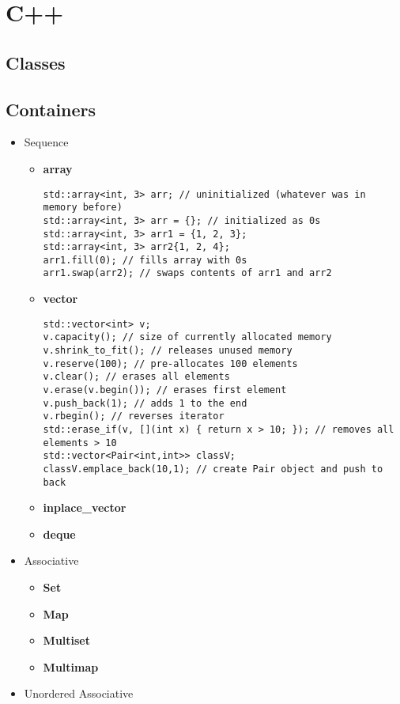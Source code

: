 \documentclass{article}
\begin{document}
\section{C++}
\subsection{Classes}
\subsection{Containers}
\begin{itemize}
	\item Sequence
	      \begin{itemize}
			  \item \textbf{array}
				  \begin{lstlisting}[style=cpp]
std::array<int, 3> arr; // uninitialized (whatever was in memory before)
std::array<int, 3> arr = {}; // initialized as 0s
std::array<int, 3> arr1 = {1, 2, 3};
std::array<int, 3> arr2{1, 2, 4};
arr1.fill(0); // fills array with 0s
arr1.swap(arr2); // swaps contents of arr1 and arr2
				  \end{lstlisting}
		      \item \textbf{vector}
			      \begin{lstlisting}[style=cpp]
std::vector<int> v;
v.capacity(); // size of currently allocated memory
v.shrink_to_fit(); // releases unused memory
v.reserve(100); // pre-allocates 100 elements
v.clear(); // erases all elements
v.erase(v.begin()); // erases first element
v.push_back(1); // adds 1 to the end
v.rbegin(); // reverses iterator
std::erase_if(v, [](int x) { return x > 10; }); // removes all elements > 10
std::vector<Pair<int,int>> classV;
classV.emplace_back(10,1); // create Pair object and push to back
			      \end{lstlisting}
		      \item \textbf{inplace\_vector}
		      \item \textbf{deque}
	      \end{itemize}
	\item Associative
	      \begin{itemize}
		      \item \textbf{Set}
		      \item \textbf{Map}
		      \item \textbf{Multiset}
		      \item \textbf{Multimap}
	      \end{itemize}
	\item Unordered Associative

\end{itemize}
\end{document}
